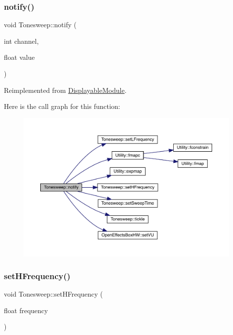 \subsubsection{\texorpdfstring{notify()}{notify()}}
{\footnotesize\ttfamily void Tonesweep\+::notify (\begin{DoxyParamCaption}\item[{int}]{channel,  }\item[{float}]{value }\end{DoxyParamCaption})\hspace{0.3cm}{\ttfamily [virtual]}}



Reimplemented from \mbox{\hyperlink{class_displayable_module_a8ae5383931f10c54cff2feef2bc07dee}{Displayable\+Module}}.

Here is the call graph for this function\+:\nopagebreak
\begin{figure}[H]
\begin{center}
\leavevmode
\includegraphics[width=350pt]{class_tonesweep_a26d324fb0de4aac00a04e7e7e9e812c0_cgraph}
\end{center}
\end{figure}
\mbox{\label{class_tonesweep_aa4f50b9008e57267144ed3ac20ed977e}} 
\subsubsection{\texorpdfstring{set\+H\+Frequency()}{setHFrequency()}}
{\footnotesize\ttfamily void Tonesweep\+::set\+H\+Frequency (\begin{DoxyParamCaption}\item[{float}]{frequency }\end{DoxyParamCaption})}

